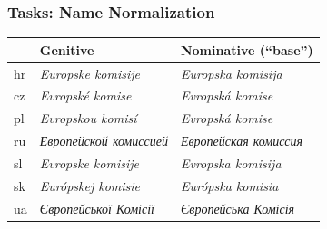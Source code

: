 \documentclass{beamer}
\newcommand\textcyr[1]{{\fontencoding{T2A}\selectfont #1}}
\newcommand{\comment}[1]{}
\begin{document}
\begin{frame}[fragile]
 \frametitle{Tasks: Name Normalization}

\begin{table}
  \begin{center}
    \begin{footnotesize}      
      \begin{tabular}{lll}
        \toprule 
        \comment{Lan} & {Genitive} & {Nominative (``base'')}\\
        \midrule
        hr & {\color{blue}\textit{Europske komisije}} & {\color{blue}\textit{Europska komisija}} \\
        cz & {\color{blue}\textit{Evropsk\'{e} komise}} & {\color{blue}\textit{Evropsk\'{a} komise}} \\
        pl & {\color{blue}\textit{Evropskou komisí}} & {\color{blue}\textit{Evropská komise}} \\
       ru & {\color{blue}\textit{\textcyr{Европейской комиссией}}} & {\color{blue}\textit{\textcyr{Европейская комиссия}}} \\
        sl & {\color{blue}\textit{Evropske komisije}} & {\color{blue}\textit{Evropska komisija}} \\
        sk & {\color{blue}\textit{Európskej komisie}} & {\color{blue}\textit{Európska komisia}} \\
        ua & {\color{blue}\textit{\textcyr{Європейської Комісії}}} & {\color{blue}\textit{\textcyr{Європейська Комісія}}} \\
        \bottomrule
      \end{tabular}
    \end{footnotesize}
  \end{center}
\end{table}

\end{frame}
\end{document}
